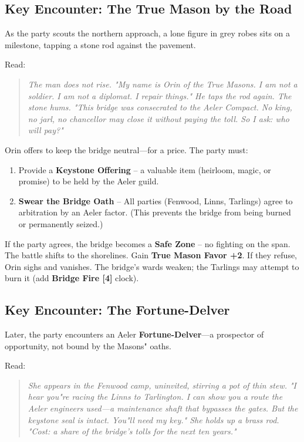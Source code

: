 \documentclass[11pt]{book}
\begin{document}
\subsection*{Key Encounter: The True Mason by the Road}
As the party scouts the northern approach, a lone figure in grey robes sits on a milestone, tapping a stone rod against the pavement.

Read:
\begin{quote}
\emph{The man does not rise. "My name is Orin of the True Masons. I am not a soldier. I am not a diplomat. I repair things." He taps the rod again. The stone hums. "This bridge was consecrated to the Aeler Compact. No king, no jarl, no chancellor may close it without paying the toll. So I ask: who will pay?"}
\end{quote}

Orin offers to keep the bridge neutral---for a price. The party must:
\begin{enumerate}
    \item Provide a \textbf{Keystone Offering} -- a valuable item (heirloom, magic, or promise) to be held by the Aeler guild.
    \item \textbf{Swear the Bridge Oath} -- All parties (Fenwood, Linns, Tarlings) agree to arbitration by an Aeler factor. (This prevents the bridge from being burned or permanently seized.)
\end{enumerate}
If the party agrees, the bridge becomes a \textbf{Safe Zone} -- no fighting on the span. The battle shifts to the shorelines. Gain \textbf{True Mason Favor +2}. If they refuse, Orin sighs and vanishes. The bridge's wards weaken; the Tarlings may attempt to burn it (add \textbf{Bridge Fire [4]} clock).

\subsection*{Key Encounter: The Fortune-Delver}
Later, the party encounters an Aeler \textbf{Fortune-Delver}---a prospector of opportunity, not bound by the Masons" oaths.

Read:
\begin{quote}
\emph{She appears in the Fenwood camp, uninvited, stirring a pot of thin stew. "I hear you"re racing the Linns to Tarlington. I can show you a route the Aeler engineers used---a maintenance shaft that bypasses the gates. But the keystone seal is intact. You"ll need my key." She holds up a brass rod. "Cost: a share of the bridge's tolls for the next ten years."}
\end{quote}
\end{document}
